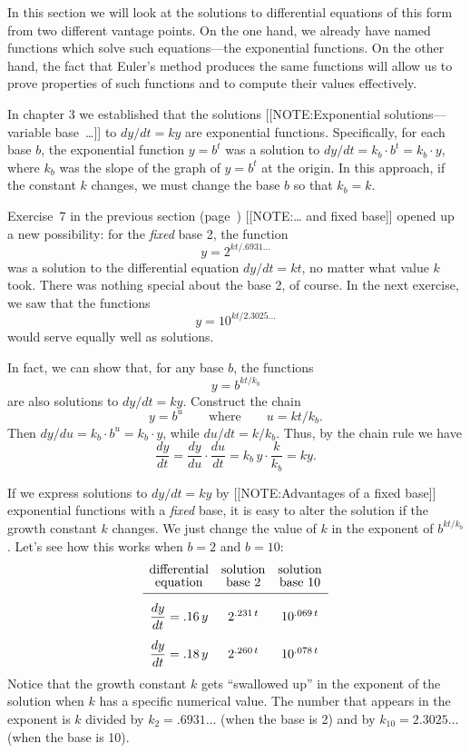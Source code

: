 In this section we will look at the solutions to differential equations of this form from two different vantage points.  On the one hand, we already have named functions which solve such equations---the exponential functions.  On the other hand, the fact that Euler's method produces the same functions will allow us to prove properties of such functions and  to compute their values effectively.

	In chapter 3 we established that the solutions 
	[[NOTE:Exponential solutions---variable base~\ldots]]
to $dy/dt = ky$ are exponential functions.  Specifically, for each base $b$, the exponential function $y = b^t$ was a solution to $dy/dt = k_b \cdot b^t = k_b \cdot y$, where $k_b$ was the slope of the graph of $y = b^t$ at the origin.  In this approach, if the constant $k$ changes, we must change the base $b$ so that $k_b = k$.


Exercise~7 in the previous section (page~\pageref{ex:base 2}) [[NOTE:\ldots
  and   fixed base]] opened up a new possibility: for the {\em
  fixed\/} base 2, the function
	\[
y = 2^{kt/.6931\ldots}
\]
was a solution to the differential equation $dy/dt = kt$, no matter what value $k$ took.  There was nothing special about the base 2, of course.  In the next exercise, we saw that the functions
	\[
y = 10^{kt/2.3025\ldots}
\]
would serve equally well as solutions.  

	In fact, we can show that, for any base $b$, the functions
	\[
y = b^{kt/k_b}
\]
are also solutions to $dy/dt = ky$.  Construct the chain
	\[
y = b^u \qquad \mbox{where} \qquad u = kt/k_b.
\]
Then $dy/du = k_b\cdot b^u = k_b\cdot y$, while $du/dt = k/k_b$.  Thus, by the chain rule we have
	\[
\dfrac{dy}{dt} = \dfrac{dy}{du} \cdot \dfrac{du}{dt} =
		k_b\, y \cdot \dfrac{k}{k_b} = k y.
\]

	If we express solutions to $dy/dt = ky$ by 
	[[NOTE:Advantages of a fixed base]]
exponential functions with a {\em fixed\/} base, it is easy to alter the solution if the growth constant $k$ changes.  We just change the value of $k$ in the exponent of $b^{kt/k_b}$.  Let's see how this works when $b = 2$ and $b = 10$:
\addtolength{\arraycolsep}{6pt}
	\[
\begin{array}{ccc}
	\mbox{differential} & \mbox{solution} & 
		\mbox{solution} \\[-2pt]
	\mbox{equation} & \mbox{base 2} & 
		\mbox{base 10}  \\[2pt] \hline
	\dfrac{dy}{dt} = .16 \, y &
		\rule{0pt}{21pt} 2^{.231\,t} \rule{0pt}{21pt} &
		10^{.069\,t} \\ [12pt]
	\dfrac{dy}{dt} = .18 \, y &
		2^{.260\,t} & 10^{.078\,t}
	\end{array}
\]
Notice that the growth constant $k$ gets ``swallowed up'' in the exponent of the solution when $k$ has a specific numerical value.  The number that appears in the exponent is $k$ divided by $k_2 = .6931\ldots$ (when the base is 2) and by $k_{10} = 2.3025\ldots$ (when the base is 10).

